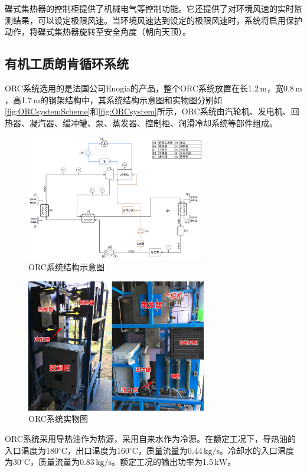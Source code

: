 碟式集热器的控制柜提供了机械电气等控制功能。它还提供了对环境风速的实时监测结果，可以设定极限风速。当环境风速达到设定的极限风速时，系统将启用保护动作，将碟式集热器旋转至安全角度（朝向天顶）。

\subsection{有机工质朗肯循环系统}
ORC系统选用的是法国公司Enogia的产品，整个ORC系统放置在长1.2$\,\mathrm{m}$，宽0.8$\,\mathrm{m}$，高1.7$\,\mathrm{m}$的钢架结构中，其系统结构示意图和实物图分别如\autoref{fig:ORCsystemScheme}和\autoref{fig:ORCsystem}所示，ORC系统由汽轮机、发电机、回热器、凝汽器、缓冲罐、泵、蒸发器、控制柜、润滑冷却系统等部件组成。
\begin{figure}[!ht]
\centering
\includegraphics[width=0.7\textwidth]{fig/ORCsystemScheme.jpg}
\caption{ORC系统结构示意图}
\label{fig:ORCsystemScheme}
\end{figure}
\begin{figure}[!ht]
\centering
\includegraphics[width=0.7\textwidth]{fig/ORCsystem.jpg}
\caption{ORC系统实物图}
\label{fig:ORCsystem}
\end{figure}

ORC系统采用导热油作为热源，采用自来水作为冷源。在额定工况下，导热油的入口温度为180$\mathrm{^\circ C}$，出口温度为160$\mathrm{^\circ C}$，质量流量为0.44$\,\mathrm{kg/s}$。冷却水的入口温度为30$\mathrm{^\circ C}$，质量流量为0.83$\,\mathrm{kg/s}$。额定工况的输出功率为1.5$\,\mathrm{kW}$。


